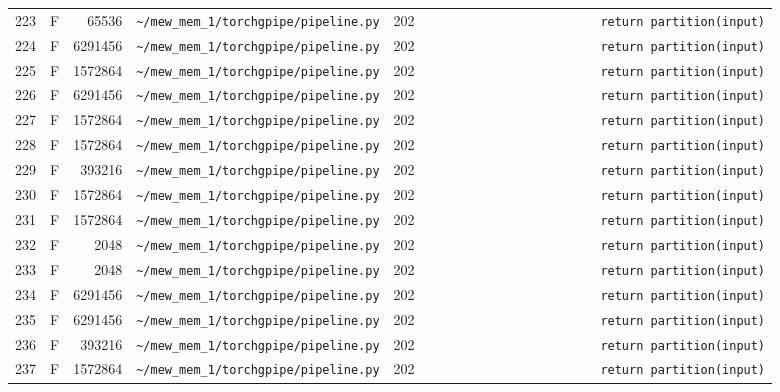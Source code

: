 \documentclass{article}
\begin{document}
\begin{longtable}{r l r p{6.5cm} r p{7.0cm}}
223 & F & 65536 & \lstinline|~/mew_mem_1/torchgpipe/pipeline.py| & 202 & \lstinline|                        return partition(input)| \\
224 & F & 6291456 & \lstinline|~/mew_mem_1/torchgpipe/pipeline.py| & 202 & \lstinline|                        return partition(input)| \\
225 & F & 1572864 & \lstinline|~/mew_mem_1/torchgpipe/pipeline.py| & 202 & \lstinline|                        return partition(input)| \\
226 & F & 6291456 & \lstinline|~/mew_mem_1/torchgpipe/pipeline.py| & 202 & \lstinline|                        return partition(input)| \\
227 & F & 1572864 & \lstinline|~/mew_mem_1/torchgpipe/pipeline.py| & 202 & \lstinline|                        return partition(input)| \\
228 & F & 1572864 & \lstinline|~/mew_mem_1/torchgpipe/pipeline.py| & 202 & \lstinline|                        return partition(input)| \\
229 & F & 393216 & \lstinline|~/mew_mem_1/torchgpipe/pipeline.py| & 202 & \lstinline|                        return partition(input)| \\
230 & F & 1572864 & \lstinline|~/mew_mem_1/torchgpipe/pipeline.py| & 202 & \lstinline|                        return partition(input)| \\
231 & F & 1572864 & \lstinline|~/mew_mem_1/torchgpipe/pipeline.py| & 202 & \lstinline|                        return partition(input)| \\
232 & F & 2048 & \lstinline|~/mew_mem_1/torchgpipe/pipeline.py| & 202 & \lstinline|                        return partition(input)| \\
233 & F & 2048 & \lstinline|~/mew_mem_1/torchgpipe/pipeline.py| & 202 & \lstinline|                        return partition(input)| \\
234 & F & 6291456 & \lstinline|~/mew_mem_1/torchgpipe/pipeline.py| & 202 & \lstinline|                        return partition(input)| \\
235 & F & 6291456 & \lstinline|~/mew_mem_1/torchgpipe/pipeline.py| & 202 & \lstinline|                        return partition(input)| \\
236 & F & 393216 & \lstinline|~/mew_mem_1/torchgpipe/pipeline.py| & 202 & \lstinline|                        return partition(input)| \\
237 & F & 1572864 & \lstinline|~/mew_mem_1/torchgpipe/pipeline.py| & 202 & \lstinline|                        return partition(input)| \\

\end{longtable}
\end{document}
